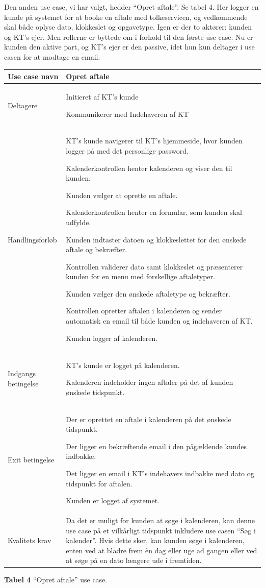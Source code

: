 \documentclass[12pt]{article}   %
\newcommand{\nextitem}{\par\hspace*{\labelsep}\textbullet\hspace*{\labelsep}}
\begin{document}
Den anden use case, vi har valgt, hedder ``Opret aftale''. Se tabel 4.  Her 
logger en kunde på systemet for at booke en aftale med tolkeservicen, og
vedkommende skal både oplyse dato, klokkeslet og opgavetype. Igen er der to
aktører: kunden og KT's ejer. Men rollerne er byttede om i forhold til den
første use case. Nu er kunden den aktive part, og KT's ejer er den passive,
idet hun kun deltager i use casen for at modtage en email.\\


\begin{tabular}{l p{10cm}}
Use case navn & Opret aftale \\ \hline
Deltagere & \nextitem Initieret af KT's kunde
            \nextitem Kommunikerer med Indehaveren af KT\\ \hline
Handlingsforløb &
	\nextitem KT's kunde navigerer til KT's hjemmeside, hvor kunden logger
	på med det personlige password.
	\nextitem Kalenderkontrollen henter kalenderen og viser den til
	kunden.
	\nextitem Kunden vælger at oprette en aftale.
	\nextitem Kalenderkontrollen henter en formular, som kunden skal
	udfylde.
	\nextitem Kunden indtaster datoen og klokkeslettet for den ønskede 
	aftale og bekræfter.
	\nextitem Kontrollen validerer dato samt klokkeslet og præsenterer
	kunden for en menu med forskellige aftaletyper.
	\nextitem Kunden vælger den ønskede aftaletype og bekræfter.
	\nextitem Kontrollen opretter aftalen i kalenderen og sender
	automatisk en email til både kunden og indehaveren af KT. 
	\nextitem Kunden logger af kalenderen.
	\\ \hline
	Indgangs betingelse &
		\nextitem KT's kunde er logget på kalenderen. 
		\nextitem Kalenderen indeholder ingen aftaler på det af kunden
		ønskede tidspunkt.
		\\ \hline
Exit betingelse & 
	\nextitem Der er oprettet en aftale i kalenderen på det ønskede
	tidspunkt. 
		\nextitem Der ligger en bekræftende email i den pågældende kundes
			indbakke.
		\nextitem Det ligger en email i KT's indehavers
			indbakke med dato og tidspunkt for aftalen. 
		\nextitem Kunden er logget af systemet.\\ \hline
		Kvalitets krav & Da det er muligt for kunden at søge i
		kalenderen, kan denne use case på et vilkårligt tidspunkt
		inkludere use casen  ``Søg i kalender''. Hvis dette sker, kan
		kunden søge i kalenderen, enten ved at bladre frem èn dag eller uge
		ad gangen eller ved at søge på en dato længere ude i
		fremtiden.\\ \hline
\end{tabular}
\begin{center}
\textbf{Tabel 4} ``Opret aftale'' use case.
\end{center}
\vspace{0.5cm}
\end{document}

